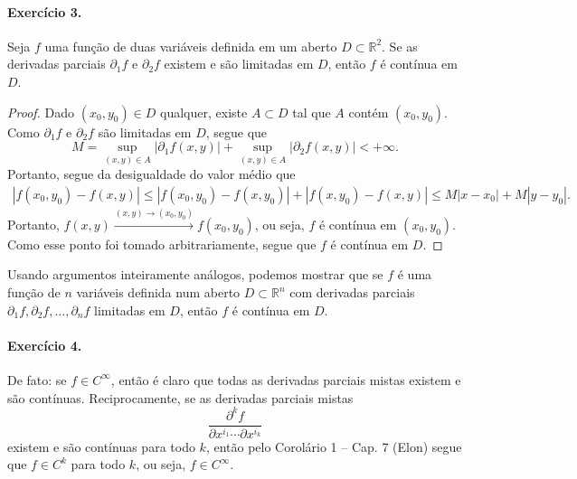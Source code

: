 \documentclass[12pt,a4paper]{article}
\newcommand{\R}{\mathbb{R}}
\begin{document}
\paragraph{Exercício 3.}
%
Seja $f$ uma função de duas variáveis definida em um aberto $D \subset \R^2$.
Se as derivadas parciais $\partial_1 f$ e $\partial_2 f$ existem e são limitadas
em $D$, então $f$ é contínua em $D$.
%
\begin{proof}
    Dado $(x_0, y_0) \in D$ qualquer, existe $A \subset D$ tal que $A$ contém $(x_0, y_0)$.
    Como $\partial _1 f$ e $\partial_2 f$ são limitadas em $D$, segue que
    \begin{equation*}
        M 
        = 
        \sup_{(x, y) \in A} |\partial_1 f(x, y)|
        +
        \sup_{(x, y) \in A} |\partial_2 f(x, y)| 
        <
        + \infty.
    \end{equation*}
    Portanto, segue da desigualdade do valor médio que
    \begin{align*}
        |f(x_0, y_0) - f(x, y)| 
        \leq
        |f(x_0, y_0) - f(x, y_0)|
        +
        |f(x, y_0) - f(x, y)|
        \leq
        M|x - x_0| + M|y - y_0|.
    \end{align*}
    Portanto, $f(x, y) \xrightarrow{(x, y) \to (x_0, y_0)} f(x_0, y_0)$, ou seja,
    $f$ é contínua em $(x_0, y_0)$. Como esse ponto foi tomado arbitrariamente, segue que
    $f$ é contínua em $D$.
\end{proof}
%
Usando argumentos inteiramente análogos, podemos mostrar que se $f$ é uma função
de $n$ variáveis definida num aberto $D \subset \R^n$ com derivadas parciais
$\partial_1 f, \partial_2 f, \dots, \partial_n f$ limitadas em $D$, então $f$
é contínua em $D$.
%
\paragraph{Exercício 4.} 
%
De fato: se $f\in C^{\infty}$, então é claro que todas as derivadas parciais
mistas existem e são contínuas. Reciprocamente, se as derivadas parciais mistas
%
\begin{equation*}
    \frac{\partial^k f}{\partial x^{i_1} \cdots \partial x^{i_k}}
\end{equation*}
%
existem e são contínuas para todo $k$, então pelo Corolário 1 -- Cap. 7 (Elon) segue
que $f\in C^k$ para todo $k$, ou seja, $f \in C^{\infty}$.
%
\end{document}
